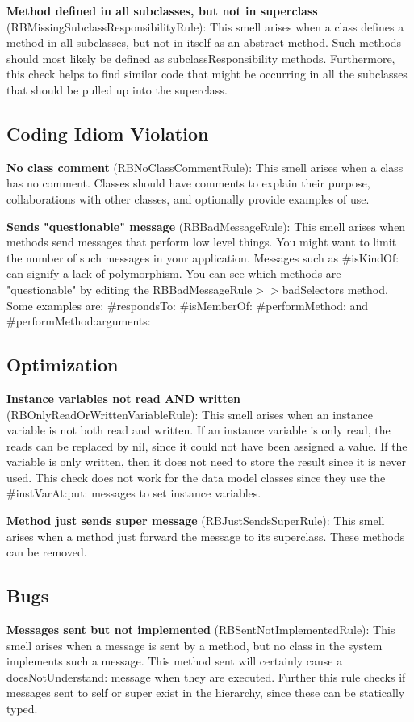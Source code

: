 \textbf{Method defined in all subclasses, but not in superclass} (RBMissingSubclassResponsibilityRule): This smell arises when a class defines a method in all subclasses, but not in itself as an abstract method. Such methods should most likely be defined as subclassResponsibility methods. Furthermore, this check helps to find similar code that might be occurring in all the subclasses that should be pulled up into the superclass.

\subsection{Coding Idiom Violation}
\textbf{No class comment} (RBNoClassCommentRule): This smell arises when a class has no comment. Classes should have comments to explain their purpose, collaborations with other classes, and optionally provide examples of use.

\textbf{Sends "questionable" message} (RBBadMessageRule): This smell arises when methods send messages that perform low level things. You might want to limit the number of such messages in your application. Messages such as \#isKindOf: can signify a lack of polymorphism. You can see which methods are "questionable" by editing the RBBadMessageRule$>>$badSelectors method. Some examples are: \#respondsTo: \#isMemberOf: \#performMethod: and \#performMethod:arguments:

\subsection{Optimization}
\textbf{Instance variables not read AND written} (RBOnlyReadOrWrittenVariableRule): This smell arises when an instance variable is not both read and written. If an instance variable is only read, the reads can be replaced by nil, since it could not have been assigned a value. If the variable is only written, then it does not need to store the result since it is never used. This check does not work for the data model classes since they use the \#instVarAt:put: messages to set instance variables.

\textbf{Method just sends super message} (RBJustSendsSuperRule): This smell arises when a method just forward the message to its superclass. These methods can be removed.

\subsection{Bugs}
\textbf{Messages sent but not implemented} (RBSentNotImplementedRule): This smell arises when a message is sent by a method,  but no class in the system implements such a message. This method sent will certainly cause a doesNotUnderstand: message when they are executed.  Further this rule checks if messages sent to self or super exist in the hierarchy, since these can be statically typed.

